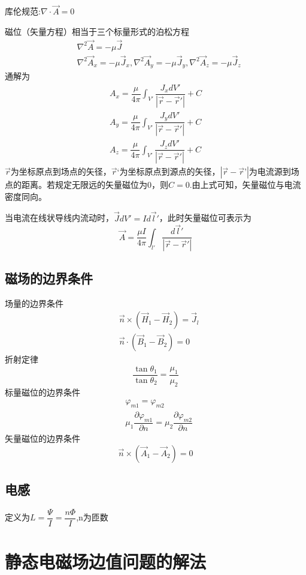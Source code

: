 \documentclass{ctexart}
\begin{document}
库伦规范:$\nabla \cdot \vec{A}=0$

磁位（矢量方程）相当于三个标量形式的泊松方程
\begin{align}
    &\nabla ^2 \vec{A}=-\mu \vec{J}\\
    &\nabla ^2 \vec{A}_x=-\mu \vec{J}_x,  \nabla ^2 \vec{A}_y=-\mu \vec{J}_y,\nabla ^2 \vec{A}_z=-\mu \vec{J}_z
\end{align}
通解为
\begin{align}
    A_x=\dfrac{\mu}{4 \pi}\int_{V'} \dfrac{J_x dV'}{|\vec{r}-\vec{r}'|}+C\\
    A_y=\dfrac{\mu}{4 \pi}\int_{V'} \dfrac{J_y dV'}{|\vec{r}-\vec{r}'|}+C\\
    A_z=\dfrac{\mu}{4 \pi}\int_{V'} \dfrac{J_z dV'}{|\vec{r}-\vec{r}'|}+C
\end{align}
$\vec{r}$为坐标原点到场点的矢径，$\vec{r}‘$为坐标原点到源点的矢径，$|\vec{r}-\vec{r}’|$为电流源到场点的距离。若规定无限远的矢量磁位为0，则$C=0$.由上式可知，矢量磁位与电流密度同向。

当电流在线状导线内流动时，$\vec{J}dV'=Id\vec{l}'$，此时矢量磁位可表示为
\begin{equation}
    \vec{A}=\dfrac{\mu I}{4 \pi}\int_{l'} \dfrac{d\vec{l}'}{|\vec{r}-\vec{r}'|}
\end{equation}
\subsection{磁场的边界条件}
场量的边界条件
\begin{align}
    &\vec{n}\times (\vec{H}_1-\vec{H}_2)=\vec{J}_l\\
    &\vec{n}\cdot (\vec{B}_1-\vec{B}_2)=0
\end{align}
折射定律
\begin{equation}
    \dfrac{\tan \theta_1}{\tan \theta_2}=\dfrac{\mu_1}{\mu_2}
\end{equation}
标量磁位的边界条件
\begin{align}
    &\varphi_{m1}=\varphi_{m2}\\
    &\mu_1 \dfrac{\partial \varphi_{m1}}{\partial n}=\mu_2 \dfrac{\partial \varphi_{m2}}{\partial n}
\end{align}
矢量磁位的边界条件
\begin{equation}
    \vec{n}\times (\vec{A}_1-\vec{A}_2)=0
\end{equation}
\subsection{电感}
定义为$L=\dfrac{\varPsi }{I}=\dfrac{n \Phi}{I}$,n为匝数
\section{静态电磁场边值问题的解法}
\end{document}
